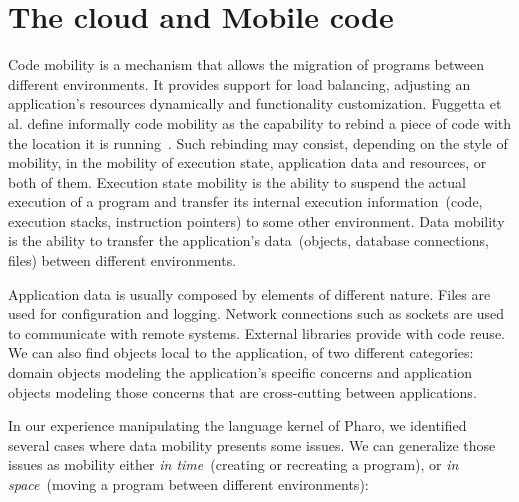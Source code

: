 \section{The cloud and Mobile code}



Code mobility is a mechanism that allows the migration of programs between different environments. It provides support for \eg load balancing, adjusting an application's resources dynamically and functionality customization. Fuggetta et al. define informally code mobility as the capability to rebind a piece of code with the location it is running~\cite{Fugg98a}. Such rebinding may consist, depending on the style of mobility, in the mobility of execution state, application data and resources, or both of them. Execution state mobility is the ability to suspend the actual execution of a program and transfer its internal execution information~(\eg code, execution stacks, instruction pointers) to some other environment. Data mobility is the ability to transfer the application's data~(\eg objects, database connections, files) between different environments.

Application data is usually composed by elements of different nature. Files are used for configuration and logging. Network connections such as sockets are used to communicate with remote systems. External libraries provide with code reuse. We can also find objects local to the application, of two different categories: domain objects modeling the application's specific concerns and application objects modeling those concerns that are cross-cutting between applications.

In our experience manipulating the language kernel of Pharo, we identified several cases where data mobility presents some issues. We can generalize those issues as mobility either \emph{in time}~(\ie creating or recreating a program), or \emph{in space}~(\ie moving a program between different environments):


